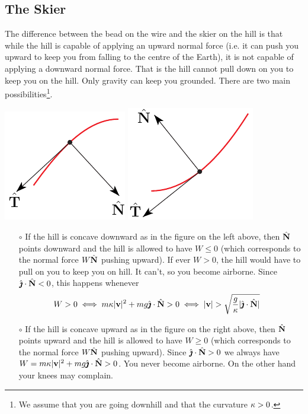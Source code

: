 \subsection*{The Skier}
The difference between the bead on the wire and the skier on
the hill is that while the hill is capable of applying an upward normal
force (i.e. it can push you upward to keep you from falling to 
the centre of the Earth), it is not capable of applying a downward 
normal force. That is the hill cannot pull down on you to keep you 
on the hill. Only gravity can keep you grounded. There are two 
main possibilities\footnote{We assume that you are going downhill and that the
curvature $\kappa>0$.}.

\begin{efig}
\begin{center}
    \includegraphics{wireD.pdf} \qquad\qquad
    \includegraphics{wireU.pdf}
\end{center}
\end{efig}


\begin{itemize}\itemsep1pt \parskip0pt  %
\item[$\circ$]
If the hill is concave downward as in the figure
on the left above, then $\hat{\mathbf{N}}$ points downward and the hill is 
allowed to have
$W\le 0$ (which corresponds to the normal force $W\hat{\mathbf{N}}$ pushing upward). 
If ever $W>0$, the hill would have to pull on you to keep you on hill. 
It can't, so you become airborne. Since $\hat{\pmb{\jmath}}\cdot \hat{\mathbf{N}}<0$, this happens
whenever 
\begin{align*}
W>0 &\iff m\kappa|\mathbf{v}|^2+mg\hat{\pmb{\jmath}}\cdot \hat{\mathbf{N}} >0 
    \iff |\mathbf{v}| > \sqrt{\frac{g}{\kappa}|\hat{\pmb{\jmath}}\cdot \hat{\mathbf{N}}|}
\end{align*}

\item[$\circ$] 
If the hill is concave upward as in the figure
on the right above, then $\hat{\mathbf{N}}$ points upward and the hill is 
allowed to have $W\ge 0$ (which corresponds to the normal force 
$W\hat{\mathbf{N}}$ pushing upward). Since $\hat{\pmb{\jmath}}\cdot \hat{\mathbf{N}}>0$ we always 
have $W=m\kappa|\mathbf{v}|^2+mg\hat{\pmb{\jmath}}\cdot \hat{\mathbf{N}} > 0$.
You never become airborne. On the other hand your knees may complain.
\end{itemize}


